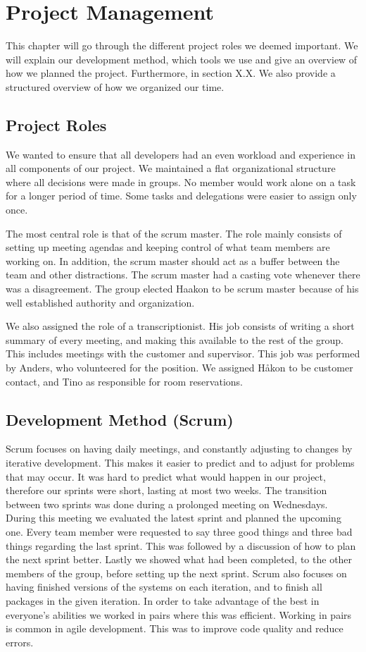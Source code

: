 \chapter{Project Management}
This chapter will go through the different project roles we deemed
important. We will explain our development method, which tools we use
and give an overview of how we planned the project. Furthermore, in
section X.X. We also provide a structured overview of how we organized
our time. 

\section{Project Roles}
We wanted to ensure that all developers had an even workload and
experience in all components of our project. We
maintained a flat organizational structure where all decisions were
made in groups. No member would work alone on a task for a longer
period of time. Some tasks and delegations were easier to assign only once.

The most central role is that of the scrum master. The role mainly
consists of setting up meeting agendas and keeping control of what
team members are working on. In addition, the scrum master should act
as a buffer between the team and other distractions. The scrum master had a
casting vote whenever there was a disagreement. The group elected Haakon to be
scrum master because of his well established authority and organization.

We also assigned the role of a transcriptionist. His job consists of
writing a short summary of every meeting, and making this available to
the rest of the group. This includes meetings with the customer and
supervisor. This job was performed by Anders, who volunteered for the
position. We assigned Håkon to be customer contact, and
Tino as responsible for room reservations.

\section{Development Method (Scrum)}
Scrum focuses on having daily meetings, and constantly adjusting to
changes by iterative development. This makes it easier to predict and
to adjust for problems that may occur. It was hard to predict what
would happen in our project, therefore our sprints were short, lasting
at most two weeks. The transition between two sprints was done during a
prolonged meeting on Wednesdays. During this meeting we evaluated the
latest sprint and planned the upcoming one. Every team member were
requested to say three good things and three bad things regarding the
last sprint. This was followed by a discussion of how to plan the next
sprint better. Lastly we showed what had been completed, to the other
members of the group, before setting up the next sprint. Scrum also
focuses on having finished versions of the systems on each iteration,
and to finish all packages in the given iteration.
In order to take advantage of the best in everyone's
abilities we worked in pairs where this was efficient. Working in pairs
is common in agile development. This was to improve code quality and
reduce errors.

